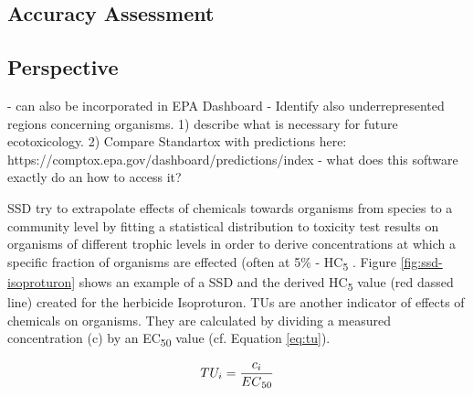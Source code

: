 \subsection*{Accuracy Assessment}


\subsection*{Perspective}

- can also be incorporated in EPA Dashboard
- Identify also underrepresented regions concerning organisms.
1) \citep{staveley_challenge_2016} describe what is necessary for future ecotoxicology.
2) Compare Standartox with predictions here: https://comptox.epa.gov/dashboard/predictions/index
- \citep{gadaleta_new_2018} what does this software exactly do an how to access it?
\fi

\iffalse
SSD try to extrapolate effects of chemicals towards organisms from species to a community level by fitting a statistical distribution to toxicity test results on organisms of different trophic levels in order to derive concentrations at which a specific fraction of organisms are effected (often at 5\% - HC\textsubscript{5} \citep{posthuma_species_2002}. Figure \ref{fig:ssd-isoproturon} shows an example of a SSD and the derived HC\textsubscript{5} value (red dassed line) created for the herbicide Isoproturon. TUs are another indicator of effects of chemicals on organisms. They are calculated by dividing a measured concentration (c) by an EC\textsubscript{50} value (cf. Equation \ref{eq:tu}).

\begin{equation}
    TU_i = \frac{c_i}{EC\textsubscript{50}}
    \label{eq:tu}
\end{equation}

